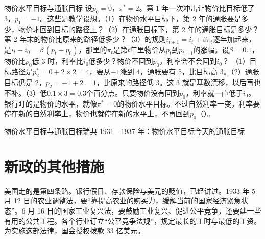 \begin{example}{物价水平目标与通胀目标}\label{ex:alternatives-target}
设$p_0=0$，$\pi^{*}=2$。第 1 年一次冲击让物价比目标低了 3，$p_1=-1$。这些是教学设想。（1）在物价水平目标下，第 2 年的通胀要是多少，物价才回到目标的路径上？（2）在通胀目标下，第 2 年的通胀目标是多少？第 2 年末的物价比原来的路径低多少？（3）的规则$i_{t+1}=i_t+\beta\pi_t$逐年加起来，是$i_t-i_0=\beta\,(p_t-p_0)$，那里的$\pi_t$是第$t$年里物价从$p_t$到$p_{t+1}$的涨幅。设$\beta=0.1$，物价比$p_0$低 3 时，利率比$i_0$低多少？物价不回到$p_0$，利率会不会回到$i_0$？
\solution （1）目标路径是$p^{*}_2=0+2\times2=4$，要从$-1$涨到 4，通胀要有 5，比目标高 3。（2）通胀目标仍是 2，$p_2=-1+2=1$，比原来的路径低 3。这 3 就是基数漂移，以后再也不补。（3）低$0.1\times3=0.3$个百分点。只要物价没有回到$p_0$，利率就一直低于$i_0$。银行盯的是物价的水平，就像$\pi^{*}=0$的物价水平目标。不过自然利率一变，利率要停在新的自然利率上，物价也就停在新的水平上，不再回到$p_0$（）。
\end{example}

\begin{compare}{物价水平目标与通胀目标}{瑞典 1931—1937 年：物价水平目标}{今天的通胀目标}
\end{compare}

\section{新政的其他措施}\label{sec:alternatives-newdeal}

美国走的是第四条路。银行假日、存款保险与美元的贬值，已经讲过。1933 年 5 月 12 日的农业调整法，要“靠提高农业的购买力，缓解当前的国家经济紧急状态”\cite{aaa1933}。6 月 16 日的国家工业复兴法，要鼓励工业复兴、促进公平竞争，还要建一些有用的公共工程\cite{nira1933}。各个行业订立“公平竞争法规”，规定最长的工时与最低的工资\cite{nira1933}。为实施这部法律，国会授权拨款 33 亿美元\cite{nira1933}。


